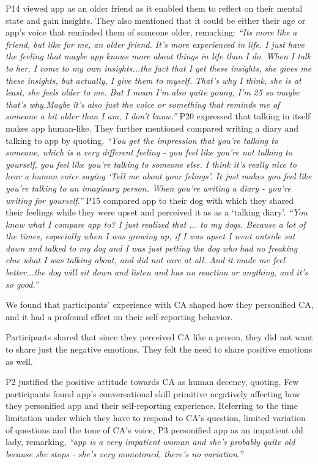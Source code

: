             P14 viewed \acl{app} as an older friend as it enabled them to reflect on their mental state and gain insights. They also mentioned that it could be either their age or \acl{app}'s voice that reminded them of someone older, remarking:
                \textit{
                ``Its more like a friend, but like for me, an older friend. It's more experienced in life. I just have the feeling that maybe \acl{app} knows more about things in life than I do. When I talk to her, I come to my own insights...the fact that I get these insights, she gives me these insights, but actually, I give them to myself. That's why I think, she is at least, she feels older to me. But I mean I'm also quite young, I'm 25 so maybe that's why.Maybe it's also just the voice or something that reminds me of someone a bit older than I am, I don't know.''
                }
            P20 expressed that talking in itself makes \acl{app} human-like. They further mentioned compared writing a diary and talking to \acl{app} by quoting,
                \textit{``You get the impression that you’re talking to someone, which is a very different feeling - you feel like you’re not talking to yourself, you feel like you’re talking to someone else. I think it’s really nice to hear a human voice saying `Tell me about your felings'. It just makes you feel like you’re talking to an imaginary person. When you're writing a diary - you’re writing for yourself.''}
            P15 compared \acl{app} to their dog with which they shared their feelings while they were upset and perceived it as as a `talking diary'.
                \textit{``You know what I compare \acl{app} to? I just realized that ... to my dogs. Because a lot of the times, especially when I was growing up, if I was upset I went outside sat down and talked to my dog and I was just petting the dog who had no freaking clue what I was talking about, and did not care at all. And it made me feel better...the dog will sit down and listen and has no reaction or anything, and it's so good.''}
            
            We found that participants' experience with \ac{CA} shaped how they personified \ac{CA}, and it had a profound effect on their self-reporting behavior.

            Participants shared that since they perceived \ac{CA} like a person, they did not want to share just the negative emotions. They felt the need to share positive emotions as well. 

            P2 justified the positive attitude towards \ac{CA} as human decency, quoting,
            Few participants found \acl{app}'s conversational skill primitive negatively affecting how they personified \acl{app} and their self-reporting experience.
            Referring to the time limitation under which they have to respond to \ac{CA}'s question, limited variation of questions and the tone of \ac{CA}'s voice, P3 personified \acl{app} as an impatient old lady, remarking,
                \textit{``\acl{app} is a very impatient woman and she’s probably quite old because she stops - she’s very monotoned, there’s no variation.''
                }


